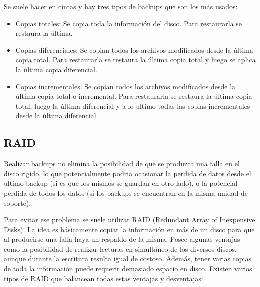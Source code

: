 \documentclass{article}
\begin{document}
Se suele hacer en cintas y hay tres tipos de backups que son los m\'as usados:

\begin{itemize}
\item Copias totales: Se copia toda la informaci\'on del disco. Para restaurarla se restaura la última.
\item Copias diferenciales: Se copian todos los archivos modificados desde la \'ultima copia total. Para restaurarla se restaura la última copia total y luego se aplica la última copia diferencial.
\item Copias incrementales: Se copian todos los archivos modificados desde la \'ultima copia total o incremental. Para restaurarla se restaura la última copia total, luego la última diferencial y a lo ultimo todas las copias incrementales desde la última diferencial.
\end{itemize}

\subsection{RAID}

Realizar backups no elimina la posibilidad de que se produzca una falla en el disco rigido, lo que potencialmente podria ocasionar la perdida de datos desde el ultimo backup (si es que los mismos se guardan en otro lado), o la potencial perdida de todos los datos (si los backups se encuentran en la misma unidad de soporte).

Para evitar ese problema se suele utilizar RAID (Redundant Array of Inexpensive Disks). La idea es b\'asicamente copiar la informaci\'on en m\'as de un disco para que al producirse una falla haya un respaldo de la misma. Posee algunas ventajas como la posibilidad de realizar lecturas en simult\'aneo de los diversos discos, aunque durante la escritura resulta igual de costoso. Adem\'as, tener varias copias de toda la informaci\'on puede requerir demasiado espacio en disco. Existen varios tipos de RAID que balancean todas estas ventajas y desventajas:
\end{document}
